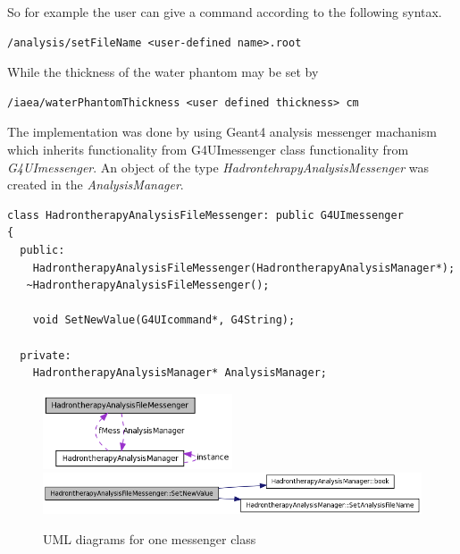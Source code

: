 So for example the user can give a command according to the following syntax.
\scriptsize
\begin{verbatim}
/analysis/setFileName <user-defined name>.root
\end{verbatim}
\normalsize
While the thickness of the water phantom may be set by
\scriptsize
\begin{verbatim}
/iaea/waterPhantomThickness <user defined thickness> cm
\end{verbatim}
\normalsize


The implementation was done by using Geant4 analysis messenger machanism which inherits functionality from G4UImessenger class functionality from \textit{G4UImessenger}. An object of the type \textit{HadrontehrapyAnalysisMessenger} was created in the \textit{AnalysisManager}.


\scriptsize
\begin{verbatim}
class HadrontherapyAnalysisFileMessenger: public G4UImessenger
{
  public:
    HadrontherapyAnalysisFileMessenger(HadrontherapyAnalysisManager*);
   ~HadrontherapyAnalysisFileMessenger();
    
    void SetNewValue(G4UIcommand*, G4String);
    
  private:
    HadrontherapyAnalysisManager* AnalysisManager;
\end{verbatim}
\normalsize
\begin{figure}[!h] 
\begin{center}
\includegraphics[width=0.5\textwidth]{images/setFileNameMessenger_1.png}  
\\
\includegraphics[width=1.0\textwidth]{images/setFileNameMessenger_2.png}  
\caption{\label{fig:messengerUML} UML diagrams for one messenger class}
 
 \end{center}
 \end{figure}

\clearpage
\renewcommand{\theequation}{D\arabic{equation}}
\setcounter{equation}{0}  
\renewcommand{\thefigure}{D\arabic{figure}}
\setcounter{figure}{0}
\renewcommand{\thetable}{D\arabic{table}}
\setcounter{table}{0}
\renewcommand{\thesection}{D}
\setcounter{section}{1}
\setcounter{subsection}{0}
